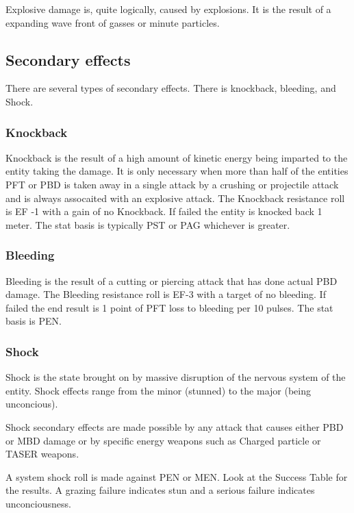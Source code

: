 Explosive damage is, quite logically, caused by explosions. It is 
the result of a expanding wave front of gasses or minute particles.

\subsection{Secondary effects}

There are several types of secondary effects. There is knockback, 
bleeding, and Shock.

\subsubsection{Knockback}

Knockback is the result of a high amount of kinetic energy being 
imparted to the entity taking the damage. It is only necessary when 
more than half of the entities PFT or PBD is taken away in a single 
attack by a crushing or projectile attack and is always assocaited 
with an explosive attack. The Knockback resistance roll is EF -1 with a
gain of no Knockback. If failed the entity is knocked back 1 meter. 
The stat basis is typically PST or PAG whichever is greater.

\subsubsection{Bleeding}

Bleeding is the result of a cutting or piercing attack that has done 
actual PBD damage. The Bleeding resistance roll is EF-3 with a target 
of no bleeding. If failed the end result is 1 point of PFT loss to 
bleeding per 10 pulses. The stat basis is PEN. 

\subsubsection{Shock}

Shock is the state brought on by massive disruption of the nervous 
system of the entity. Shock effects range from the minor (stunned) to 
the major (being unconcious). 

Shock secondary effects are made possible by any attack that causes 
either PBD or MBD damage or by specific energy weapons such as Charged
particle or TASER weapons. 

A system shock roll is made against PEN or MEN. Look at the Success
Table for the results. A grazing failure indicates stun and a serious
failure indicates unconciousness.

